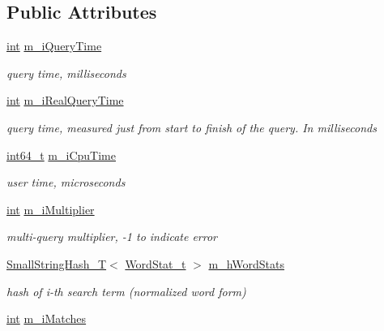 \subsection*{Public Attributes}
\begin{DoxyCompactItemize}
\item 
\hyperlink{sphinxexpr_8cpp_a4a26e8f9cb8b736e0c4cbf4d16de985e}{int} \hyperlink{classCSphQueryResultMeta_ad22d20d59f9daf6ba72e70bdae3fe170}{m\-\_\-i\-Query\-Time}
\begin{DoxyCompactList}\small\item\em query time, milliseconds \end{DoxyCompactList}\item 
\hyperlink{sphinxexpr_8cpp_a4a26e8f9cb8b736e0c4cbf4d16de985e}{int} \hyperlink{classCSphQueryResultMeta_aa9ad268e281a104663adbc6bc1370d9a}{m\-\_\-i\-Real\-Query\-Time}
\begin{DoxyCompactList}\small\item\em query time, measured just from start to finish of the query. In milliseconds \end{DoxyCompactList}\item 
\hyperlink{sphinxstd_8h_a996e72f71b11a5bb8b3b7b6936b1516d}{int64\-\_\-t} \hyperlink{classCSphQueryResultMeta_a2d1d0c5cfb53278422774abb9d642984}{m\-\_\-i\-Cpu\-Time}
\begin{DoxyCompactList}\small\item\em user time, microseconds \end{DoxyCompactList}\item 
\hyperlink{sphinxexpr_8cpp_a4a26e8f9cb8b736e0c4cbf4d16de985e}{int} \hyperlink{classCSphQueryResultMeta_ab678890016913938bb758c98a6b403dc}{m\-\_\-i\-Multiplier}
\begin{DoxyCompactList}\small\item\em multi-\/query multiplier, -\/1 to indicate error \end{DoxyCompactList}\item 
\hyperlink{classSmallStringHash__T}{Small\-String\-Hash\-\_\-\-T}$<$ \hyperlink{structCSphQueryResultMeta_1_1WordStat__t}{Word\-Stat\-\_\-t} $>$ \hyperlink{classCSphQueryResultMeta_aa669bb718f46151e057e738288adb5e3}{m\-\_\-h\-Word\-Stats}
\begin{DoxyCompactList}\small\item\em hash of i-\/th search term (normalized word form) \end{DoxyCompactList}\item 
\hyperlink{sphinxexpr_8cpp_a4a26e8f9cb8b736e0c4cbf4d16de985e}{int} \hyperlink{classCSphQueryResultMeta_ad4a2583024826d59a7970f399f4ce3c8}{m\-\_\-i\-Matches}

\end{DoxyCompactItemize}
